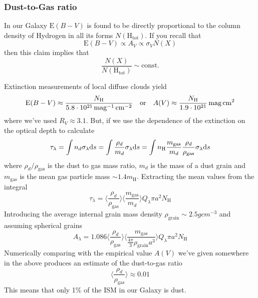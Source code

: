 \subsubsection*{Dust-to-Gas ratio}

In our Galaxy $\text{E}(B-V)$ is found to be directly proportional to the column density of Hydrogen in all its forms $N(\text{H}_{\text{tot}})$. If you recall that
\begin{equation*}
    \text{E}(B-V) \propto A_{V} \propto \sigma_{V}N(X)
\end{equation*}
then this claim implies that 
\begin{equation}
    \frac{N(X)}{N(\text{H}_{\text{tot}})} \sim \text{const.}
    \label{eq:dustgasratio}
\end{equation}
\par Extinction measurements of local diffuse clouds yield
\begin{equation*}
    \text{E}(B-V) \approx \frac{N_{\text{H}}}{5.8\cdot 10^{21}\,\text{mag}^{-1}\,\text{cm}^{-2}} \quad \text{or} \quad A(V) \approx \frac{N_{\text{H}}}{1.9\cdot 10^{21}}\,\text{mag}\,\text{cm}^{2}
\end{equation*}
where we've used $R_{V}\approx 3.1$. But, if we use the dependence of the extinction on the optical depth to calculate
\begin{equation*}
    \tau_{\lambda} = \int n_{d}\sigma_{\lambda}\text{d}s = \int \frac{\rho_{d}}{m_{d}}\sigma_{\lambda}\text{d}s = \int n_{\text{H}}\frac{m_{\text{gas}}}{m_{d}}\frac{\rho_{d}}{\rho_{\text{gas}}}\sigma_{\lambda}\text{d}s
\end{equation*}
where $\rho_{d}/\rho_{\text{gas}}$ is the dust to gas mass ratio, $m_{d}$ is the mass of a dust grain and $m_{\text{gas}}$ is the mean gas particle mass $\sim 1.4m_{\text{H}}$. Extracting the mean values from the integral
\begin{equation*}
    \tau_{\lambda} = \langle \frac{\rho_{d}}{\rho_{\text{gas}}}\rangle \langle \frac{m_{\text{gas}}}{m_{d}}\rangle Q_{\lambda}\pi a^{2}N_{\text{H}}
\end{equation*}
Introducing the average internal grain mass density $\rho_{\text{grain}}\sim 2.5\unit{g}\unit{cm}^{-3}$ and assuming spherical grains 
\begin{equation*}
    A_{\lambda} = 1.086\langle \frac{\rho_{d}}{\rho_{\text{gas}}}\rangle \langle \frac{m_{\text{gas}}}{\frac{4\pi}{3}\rho_{\text{grain}}a^{3}}\rangle Q_{\lambda}\pi a^{2}N_{\text{H}}
\end{equation*}
Numerically comparing with the empirical value $A(V)$ we've given somewhere in the above produces an estimate of the dust-to-gas ratio
\begin{equation*}
    \langle \frac{\rho_{d}}{\rho_{\text{gas}}}\rangle \approx 0.01
\end{equation*}
This means that only 1\% of the ISM in our Galaxy is dust.

